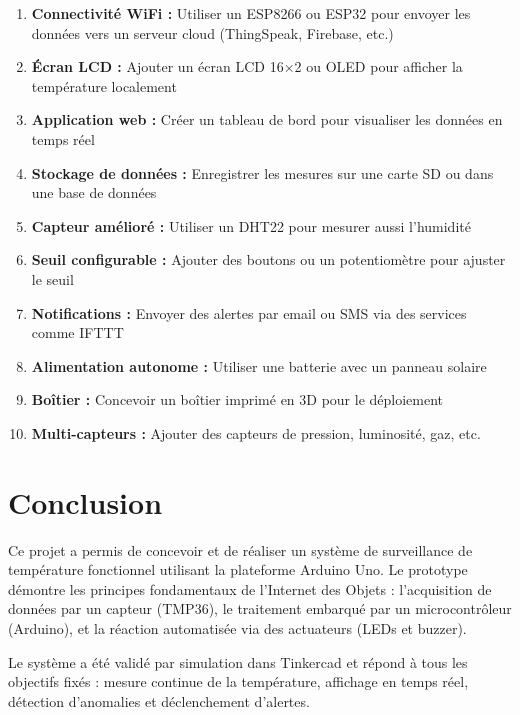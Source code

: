 \documentclass[12pt, a4paper]{article}
\begin{document}
\begin{enumerate}
    \item \textbf{Connectivité WiFi :} Utiliser un ESP8266 ou ESP32 pour envoyer les données vers un serveur cloud (ThingSpeak, Firebase, etc.)
    \item \textbf{Écran LCD :} Ajouter un écran LCD 16×2 ou OLED pour afficher la température localement
    \item \textbf{Application web :} Créer un tableau de bord pour visualiser les données en temps réel
    \item \textbf{Stockage de données :} Enregistrer les mesures sur une carte SD ou dans une base de données
    \item \textbf{Capteur amélioré :} Utiliser un DHT22 pour mesurer aussi l'humidité
    \item \textbf{Seuil configurable :} Ajouter des boutons ou un potentiomètre pour ajuster le seuil
    \item \textbf{Notifications :} Envoyer des alertes par email ou SMS via des services comme IFTTT
    \item \textbf{Alimentation autonome :} Utiliser une batterie avec un panneau solaire
    \item \textbf{Boîtier :} Concevoir un boîtier imprimé en 3D pour le déploiement
    \item \textbf{Multi-capteurs :} Ajouter des capteurs de pression, luminosité, gaz, etc.
\end{enumerate}

\section{Conclusion}

Ce projet a permis de concevoir et de réaliser un système de surveillance de température fonctionnel utilisant la plateforme Arduino Uno. Le prototype démontre les principes fondamentaux de l'Internet des Objets : l'acquisition de données par un capteur (TMP36), le traitement embarqué par un microcontrôleur (Arduino), et la réaction automatisée via des actuateurs (LEDs et buzzer).

Le système a été validé par simulation dans Tinkercad et répond à tous les objectifs fixés : mesure continue de la température, affichage en temps réel, détection d'anomalies et déclenchement d'alertes.
\end{document}
